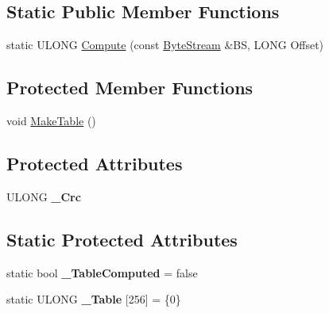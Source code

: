 \subsection*{Static Public Member Functions}
\begin{DoxyCompactItemize}
\item 
static U\+L\+O\+NG \hyperlink{class_canberra_1_1_utility_1_1_core_1_1_crc32_ad523792effe2750bc5aa6c8df262f4c7_ad523792effe2750bc5aa6c8df262f4c7}{Compute} (const \hyperlink{class_canberra_1_1_utility_1_1_core_1_1_byte_stream}{Byte\+Stream} \&BS, L\+O\+NG Offset)
\end{DoxyCompactItemize}
\subsection*{Protected Member Functions}
\begin{DoxyCompactItemize}
\item 
void \hyperlink{class_canberra_1_1_utility_1_1_core_1_1_crc32_afab8e77da81f093171fecbeb0a7db492_afab8e77da81f093171fecbeb0a7db492}{Make\+Table} ()
\end{DoxyCompactItemize}
\subsection*{Protected Attributes}
\begin{DoxyCompactItemize}
\item 
\mbox{\label{class_canberra_1_1_utility_1_1_core_1_1_crc32_aa104f9d4d79c5ed678c5f43cef9a75e3}} 
U\+L\+O\+NG {\bfseries \+\_\+\+Crc}
\end{DoxyCompactItemize}
\subsection*{Static Protected Attributes}
\begin{DoxyCompactItemize}
\item 
\mbox{\label{class_canberra_1_1_utility_1_1_core_1_1_crc32_a99dffa38097770d9c166e8b48cd40248}} 
static bool {\bfseries \+\_\+\+Table\+Computed} = false
\item 
\mbox{\label{class_canberra_1_1_utility_1_1_core_1_1_crc32_a4f158b43316868b652d8e1d535853012}} 
static U\+L\+O\+NG {\bfseries \+\_\+\+Table} \mbox{[}256\mbox{]} = \{0\}
\end{DoxyCompactItemize}


